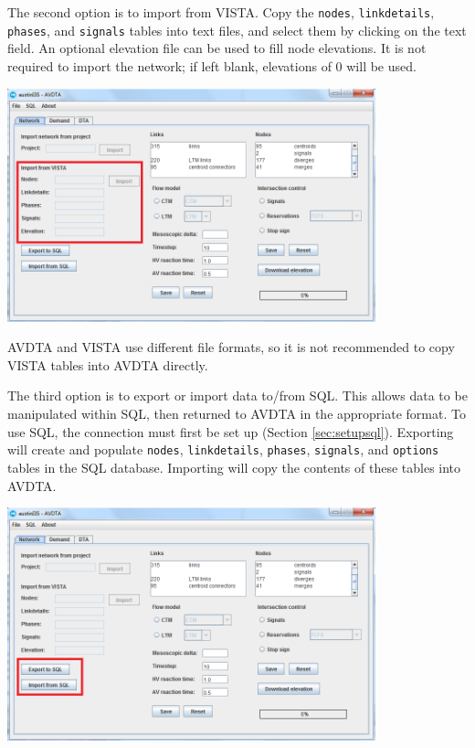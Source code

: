The second option is to import from VISTA. Copy the \texttt{nodes}, \texttt{linkdetails}, \texttt{phases}, and \texttt{signals} tables into text files, and select them by clicking on the text field. An optional elevation file can be used to fill node elevations. It is not required to import the network; if left blank, elevations of 0 will be used.
\begin{center}
\includegraphics[width=0.8\textwidth]{images/network2.png}
\end{center}
AVDTA and VISTA use different file formats, so it is not recommended to copy VISTA tables into AVDTA directly.

The third option is to export or import data to/from SQL. This allows data to be manipulated within SQL, then returned to AVDTA in the appropriate format. To use SQL, the connection must first be set up (Section \ref{sec:setupsql}). Exporting will create and populate \texttt{nodes}, \texttt{linkdetails}, \texttt{phases}, \texttt{signals}, and \texttt{options} tables in the SQL database. Importing will copy the contents of these tables into AVDTA.
\begin{center}
\includegraphics[width=0.8\textwidth]{images/sql2.png}
\end{center}
